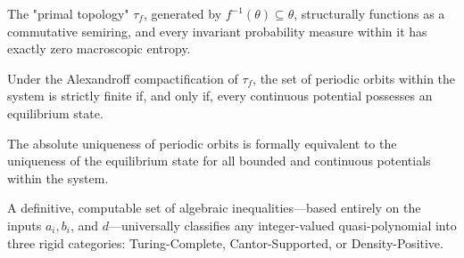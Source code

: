 \begin{lemma}
\leanok
The "primal topology" $\tau_f$, generated by $f^{-1}(\theta) \subseteq \theta$, structurally functions as a commutative semiring, and every invariant probability measure within it has exactly zero macroscopic entropy.
\end{lemma}

\begin{theorem}
\leanok
Under the Alexandroff compactification of $\tau_f$, the set of periodic orbits within the system is strictly finite if, and only if, every continuous potential possesses an equilibrium state.
\end{theorem}

\begin{lemma}
\leanok
The absolute uniqueness of periodic orbits is formally equivalent to the uniqueness of the equilibrium state for all bounded and continuous potentials within the system.
\end{lemma}

\begin{theorem}
\leanok
A definitive, computable set of algebraic inequalities---based entirely on the inputs $a_i, b_i$, and $d$---universally classifies any integer-valued quasi-polynomial into three rigid categories: Turing-Complete, Cantor-Supported, or Density-Positive.
\end{theorem}
